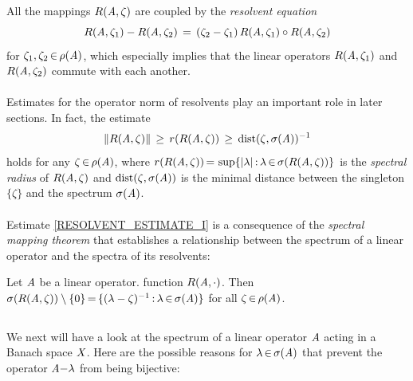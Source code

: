 \documentclass[11pt,twoside]{article}
\begin{document}
\subparagraph{} %
All the mappings $R(\mathit{A},\zeta)$ are coupled by the \textit{resolvent equation}
\begin{equation}\label{RESOLVENT_EQUATION}
R(\mathit{A},\zeta_1) - R(\mathit{A},\zeta_2)
\,=\,
(\zeta_2-\zeta_1) \, R(\mathit{A},\zeta_1) \circ R(\mathit{A},\zeta_2)
\end{equation}
for $\zeta_1,\zeta_2 {\,\in\,} \rho(\mathit{A})$,
which especially implies that
the linear operators $R(\mathit{A},\zeta_1)$ and $R(\mathit{A},\zeta_2)$
commute with each another.

\paragraph{} %
Estimates for the operator norm of resolvents play an important role
in later sections.
In fact,
the estimate
\begin{equation}\label{RESOLVENT_ESTIMATE_I}
\left\lVert R(\mathit{A},\zeta) \right\rVert \, \geq \,
r(R(\mathit{A},\zeta))     \, \geq \,
\mbox{dist}(\zeta,\sigma(\mathit{A}))^{-1}
\end{equation}
holds for any $\zeta {\,\in\,} \rho(\mathit{A})$,
where $r(R(\linA,\zeta)) \eq
\sup \{ \abs{\lambda} \: \lambda \xeof \sigma(R(\linA,\zeta)) \}$
is the \textit{spectral radius} of $R(\mathit{A},\zeta)$ and
$\mbox{dist}(\zeta,\sigma(\mathit{A}))$ is the minimal distance
between the singleton $\{\zeta\}$ and the spectrum $\sigma(\mathit{A})$.

\paragraph{} %
Estimate \eqref{RESOLVENT_ESTIMATE_I} is a consequence
of the \textit{spectral mapping theorem}
that establishes a relationship
between the spectrum of a linear operator and the spectra of its resolvents:

\begin{theorem}\label{SPECTRAL_MAPPING_THEOREM}
Let $\mathit{A}$ be a linear operator.
function $R(\mathit{A},\cdot)$.
Then $\sigma(R(\mathit{A},\zeta)) \setminus \{0\} {\,=\,}
\{(\lambda-\zeta)^{-1} {\,:\,} \lambda {\,\in\,} \sigma(\mathit{A})\}$
for all $\zeta {\,\in\,} \rho(\mathit{A})$.
\end{theorem}

\subsection{} %
We next will have a look at the spectrum 
of a linear operator $\mathit{A}$ acting in a Banach space $\mathit{X}$.
Here are the possible reasons for $\lambda {\,\in\,} \sigma(\mathit{A})$ 
that prevent the operator $\mathit{A} {-} \lambda$ from being bijective:
\end{document}
